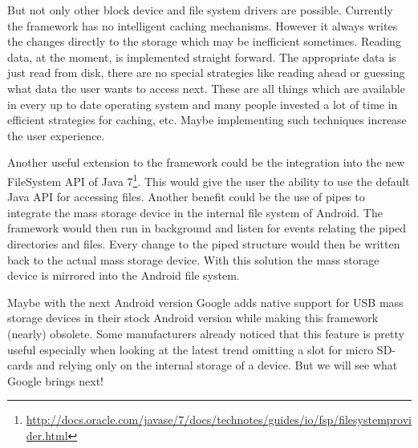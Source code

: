 But not only other block device and file system drivers are possible. Currently the framework has no intelligent caching mechanisms. However it always writes the changes directly to the storage which may be inefficient sometimes. Reading data, at the moment, is implemented straight forward. The appropriate data is just read from disk, there are no special strategies like reading ahead or guessing what data the user wants to access next. These are all things which are available in every up to date operating system and many people invested a lot of time in efficient strategies for caching, etc. Maybe implementing such techniques increase the user experience.

Another useful extension to the framework could be the integration into the new FileSystem API of Java 7\footnote{\url{http://docs.oracle.com/javase/7/docs/technotes/guides/io/fsp/filesystemprovider.html}}. This would give the user the ability to use the default Java API for accessing files. Another benefit could be the use of pipes to integrate the mass storage device in the internal file system of Android. The framework would then run in background and listen for events relating the piped directories and files. Every change to the piped structure would then be written back to the actual mass storage device. With this solution the mass storage device is mirrored into the Android file system.

Maybe with the next Android version Google adds native support for USB mass storage devices in their stock Android version while making this framework (nearly) obsolete. Some manufacturers already noticed that this feature is pretty useful especially when looking at the latest trend omitting a slot for micro SD-cards and relying only on the internal storage of a device. But we will see what Google brings next!